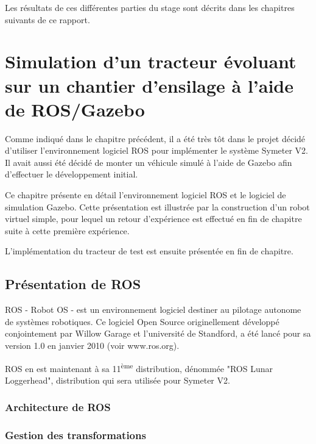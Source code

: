 \documentclass[12pt,a4paper]{report}
\begin{document}
	\para Les résultats de ces différentes parties du stage sont décrits dans les chapitres suivants de ce rapport.
	
				

\chapter{Simulation d'un tracteur évoluant sur un chantier d'ensilage à l'aide de ROS/Gazebo}

Comme indiqué dans le chapitre précédent, il a été très tôt dans le projet décidé d'utiliser l'environnement logiciel ROS pour implémenter le système Symeter V2. Il avait aussi été décidé de monter un véhicule simulé à l'aide de Gazebo afin d'effectuer le développement initial.

\para Ce chapitre présente en détail l'environnement logiciel ROS et le logiciel de simulation Gazebo. Cette présentation est illustrée par la construction d'un robot virtuel simple, pour lequel un retour d'expérience est effectué en fin de chapitre suite à cette première expérience.

\para L'implémentation du tracteur de test est ensuite présentée en fin de chapitre.

	\section{Présentation de ROS}
	
	ROS - Robot OS - est un environnement logiciel destiner au pilotage autonome de systèmes robotiques. Ce logiciel Open Source originellement développé conjointement par Willow Garage et l'université de Standford, a été lancé pour sa version 1.0 en janvier 2010 (voir www.ros.org).
	
	\para ROS en est maintenant à sa 11\textsuperscript{ème} distribution, dénommée "ROS Lunar Loggerhead", distribution qui sera utilisée pour Symeter V2.
	
		\subsection{Architecture de ROS}
		\subsection{Gestion des transformations}
\end{document}
